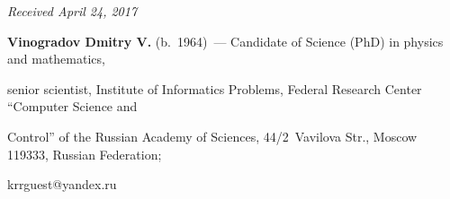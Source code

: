\vspace*{-6pt}



\hfill{\small\textit{Received April 24, 2017}}






\Contrl



\noindent

\textbf{Vinogradov Dmitry V.} (b.\ 1964)~--- Candidate of Science (PhD) in physics and mathematics, 

senior scientist, Institute of Informatics Problems, Federal Research Center ``Computer Science and 

Control'' of the Russian Academy of Sciences, 44/2~Vavilova Str., Moscow 119333, Russian Federation; 

\mbox{krrguest@yandex.ru} 

\label{end\stat}





\renewcommand{\bibname}{\protect\rm Литература} 

